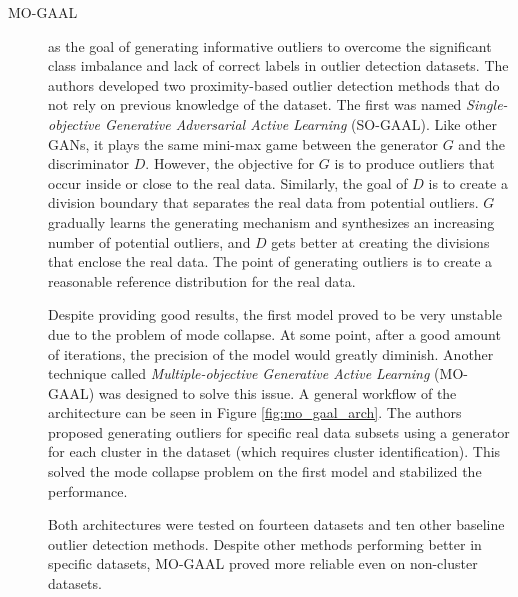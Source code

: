 \begin{description}
    \item[MO-GAAL \cite{liu.etal_GenerativeAdversarialActive_2020}] as the goal of generating informative outliers to overcome the significant class imbalance and lack of correct labels in outlier detection datasets. The authors developed two proximity-based outlier detection methods that do not rely on previous knowledge of the dataset. The first was named \textit{Single-objective Generative Adversarial Active Learning} (SO-GAAL). Like other GANs, it plays the same mini-max game between the generator $G$ and the discriminator $D$. However, the objective for $G$ is to produce outliers that occur inside or close to the real data. Similarly, the goal of $D$ is to create a division boundary that separates the real data from potential outliers. $G$ gradually learns the generating mechanism and synthesizes an increasing number of potential outliers, and $D$ gets better at creating the divisions that enclose the real data. The point of generating outliers is to create a reasonable reference distribution for the real data. 
    
    Despite providing good results, the first model proved to be very unstable due to the problem of mode collapse. At some point, after a good amount of iterations, the precision of the model would greatly diminish. Another technique called \textit{Multiple-objective Generative Active Learning} (MO-GAAL) was designed to solve this issue. A general workflow of the architecture can be seen in Figure \ref{fig:mo_gaal_arch}. The authors proposed generating outliers for specific real data subsets using a generator for each cluster in the dataset (which requires cluster identification). This solved the mode collapse problem on the first model and stabilized the performance.  
    
    Both architectures were tested on fourteen datasets and ten other baseline outlier detection methods. Despite other methods performing better in specific datasets, MO-GAAL proved more reliable even on non-cluster datasets.
\end{description}

